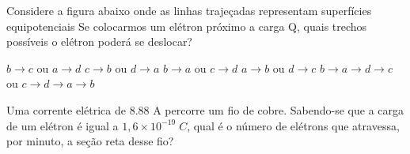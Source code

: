 \documentclass[12pt, addpoints]{exam}
\begin{document}
    \begin{questions}
\begin{multicols*}{2}
\question Considere a figura abaixo onde as linhas trajeçadas representam superfícies equipotenciais Se colocarmos um elétron próximo a carga Q, quais trechos possíveis o elétron poderá se deslocar?
        
        \begin{center}
            \begin{minipage}[c]{0.5\linewidth}
            \end{minipage}
        \end{center}
        
        

\begin{choices}
\choice $b\rightarrow c$ ou $a\rightarrow d$ 
\choice $c\rightarrow b$ ou $d\rightarrow a$ 
\choice $b\rightarrow a$ ou $c\rightarrow d$ 
\choice $a\rightarrow b$ ou $d\rightarrow c$ 
\choice $b\rightarrow a\rightarrow d\rightarrow c$ ou $c\rightarrow d\rightarrow a\rightarrow b$ 
\end{choices}
\question Uma corrente elétrica de    8.88 A percorre um ﬁo de cobre. Sabendo-se que a carga de um elétron é igual a $1,6\times 10^{-19}\;C$, qual é o número de elétrons que atravessa, por minuto, a seção reta desse ﬁo?


\end{multicols*}
\end{questions}
\end{document}
